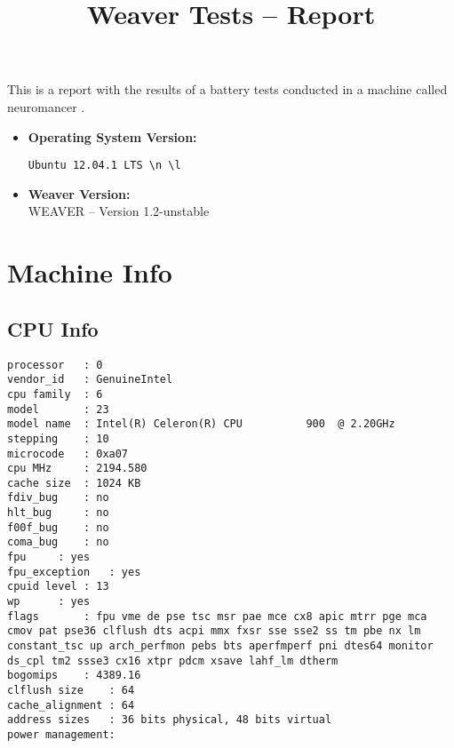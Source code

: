 \documentclass{article}
\title{Weaver Tests -- Report}
\begin{document}
\maketitle
This is a report with the results of a battery
tests conducted in a machine called 
neuromancer
.
\begin{itemize}
\item
\textbf{Operating System Version: }
\begin{verbatim}
Ubuntu 12.04.1 LTS \n \l

\end{verbatim}
\item
\textbf{Weaver Version: }\\
WEAVER -- Version 1.2-unstable
\end{itemize}
\section{Machine Info}
\subsection{CPU Info}
\begin{verbatim}
processor	: 0
vendor_id	: GenuineIntel
cpu family	: 6
model		: 23
model name	: Intel(R) Celeron(R) CPU          900  @ 2.20GHz
stepping	: 10
microcode	: 0xa07
cpu MHz		: 2194.580
cache size	: 1024 KB
fdiv_bug	: no
hlt_bug		: no
f00f_bug	: no
coma_bug	: no
fpu		: yes
fpu_exception	: yes
cpuid level	: 13
wp		: yes
flags		: fpu vme de pse tsc msr pae mce cx8 apic mtrr pge mca cmov pat pse36 clflush dts acpi mmx fxsr sse sse2 ss tm pbe nx lm constant_tsc up arch_perfmon pebs bts aperfmperf pni dtes64 monitor ds_cpl tm2 ssse3 cx16 xtpr pdcm xsave lahf_lm dtherm
bogomips	: 4389.16
clflush size	: 64
cache_alignment	: 64
address sizes	: 36 bits physical, 48 bits virtual
power management:

\end{verbatim}
\end{document}
